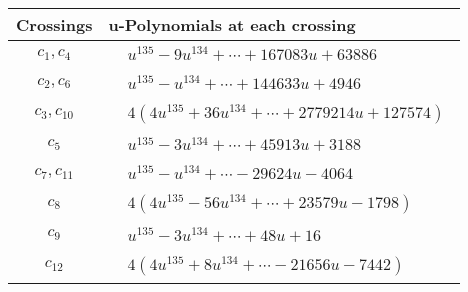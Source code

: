 \documentclass[1p]{elsarticle_modified}
\theoremstyle{definition}
\begin{document}
\begin{tabular}{m{50pt}|m{274pt}}
Crossings & \hspace{64pt}u-Polynomials at each crossing \\
\hline $$\begin{aligned}c_{1},c_{4}\end{aligned}$$&$\begin{aligned}
&u^{135}-9 u^{134}+\cdots+167083 u+63886
\end{aligned}$\\
\hline $$\begin{aligned}c_{2},c_{6}\end{aligned}$$&$\begin{aligned}
&u^{135}- u^{134}+\cdots+144633 u+4946
\end{aligned}$\\
\hline $$\begin{aligned}c_{3},c_{10}\end{aligned}$$&$\begin{aligned}
&4(4 u^{135}+36 u^{134}+\cdots+2779214 u+127574)
\end{aligned}$\\
\hline $$\begin{aligned}c_{5}\end{aligned}$$&$\begin{aligned}
&u^{135}-3 u^{134}+\cdots+45913 u+3188
\end{aligned}$\\
\hline $$\begin{aligned}c_{7},c_{11}\end{aligned}$$&$\begin{aligned}
&u^{135}- u^{134}+\cdots-29624 u-4064
\end{aligned}$\\
\hline $$\begin{aligned}c_{8}\end{aligned}$$&$\begin{aligned}
&4(4 u^{135}-56 u^{134}+\cdots+23579 u-1798)
\end{aligned}$\\
\hline $$\begin{aligned}c_{9}\end{aligned}$$&$\begin{aligned}
&u^{135}-3 u^{134}+\cdots+48 u+16
\end{aligned}$\\
\hline $$\begin{aligned}c_{12}\end{aligned}$$&$\begin{aligned}
&4(4 u^{135}+8 u^{134}+\cdots-21656 u-7442)
\end{aligned}$\\
\hline
\end{tabular}\\~\\
\end{document}
